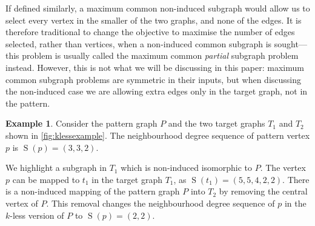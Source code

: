 \documentclass[letterpaper]{article}
\theoremstyle{definition}
\newtheorem{example}{Example}
\newcommand{\nds}{\operatorname{S}}
\begin{document}
If defined similarly, a maximum common non-induced subgraph would allow us to select every vertex in
the smaller of the two graphs, and none of the edges. It is therefore traditional to change the
objective to maximise the number of edges selected, rather than vertices, when a non-induced common
subgraph is sought---this problem is usually called the maximum common \emph{partial} subgraph
problem instead. However, this is not what we will be discussing in this paper: maximum common
subgraph problems are symmetric in their inputs, but when discussing the non-induced case we are
allowing extra edges only in the target graph, not in the pattern.

\begin{example}
Consider the pattern graph $P$ and the two target graphs $T_1$ and $T_2$ shown in
\cref{fig:klessexample}. The neighbourhood degree sequence of pattern vertex $p$ is
$\nds(p)=(3,3,2)$.

We highlight a subgraph in $T_{1}$ which is non-induced isomorphic to $P$. The vertex $p$ can be
mapped to $t_{1}$ in the target graph $T_{1}$, as $\nds(t_{1})=(5,5,4,2,2)$.  There is a non-induced
mapping of the pattern graph $P$ into $T_{2}$ by removing the central vertex of $P$.  This removal
changes the neighbourhood degree sequence of $p$ in the $k$-less version of $P$ to $\nds(p)=(2,2)$.

\begin{figure}
    \centering
    \hspace{0.5cm}
\end{figure}
\end{example}
\end{document}
